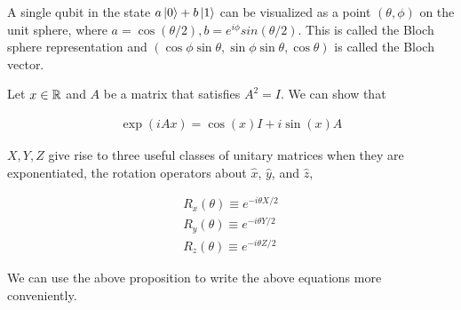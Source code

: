 \documentclass[main.tex]{subfiles}
\begin{document}
A single qubit in the state $a \ket{0} + b \ket{1}$ can be visualized as a point $(\theta, \phi)$ on the unit sphere, where $a = \cos(\theta / 2), b = e^{i\phi}sin(\theta / 2)$. This is called the Bloch sphere representation and $(\cos \phi \sin \theta , \sin \phi \sin \theta, \cos \theta)$ is called the Bloch vector.

\begin{proposition} Let $x \in \mathbb{R}$ and $A$ be a matrix that satisfies $A^2 = I$. We can show that

\begin{align*}
\exp(i A x) = \cos(x) I + i \sin(x) A
\end{align*}

%
%
%
\end{proposition}

$X, Y, Z$ give rise to three useful classes of unitary matrices when they are exponentiated, the rotation operators about $\hat{x}$, $\hat{y}$, and $\hat{z}$,

\begin{align*}
R_x(\theta) \equiv e^{-i \theta X / 2} \\
R_y(\theta) \equiv e^{-i \theta Y / 2} \\
R_z(\theta) \equiv e^{-i \theta Z / 2}
\end{align*}

We can use the above proposition to write the above equations more conveniently.
\end{document}
